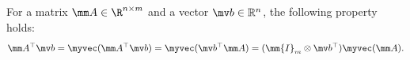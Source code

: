 \documentclass[letterpaper, journal]{IEEEtran}
\begin{document}
\begin{propsit} \label{propsit:kron}
  For a matrix $\mm A\in\R^{n\times m}$ and a vector $\mv b\in\mathbb R^n$, the following property holds:
  \begin{equation}
    \mm A^\top \mv b 
    = 
    \myvec(\mm A^\top\mv b)
    =
    \myvec(\mv b^\top\mm A)
    = 
    (\mm{I}_{m}\otimes \mv b^\top) \myvec(\mm A)
    .
  \end{equation}
\end{propsit}



\end{document}
